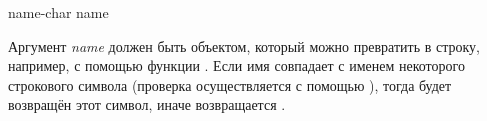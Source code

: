 \begin{defun}[Функция]
name-char name

Аргумент \emph{name} должен быть объектом, который можно превратить в строку,
например, с помощью функции .
Если имя совпадает с именем некоторого строкового символа (проверка
осуществляется с помощью ), тогда будет
возвращён этот символ, иначе возвращается {\false}.
\end{defun}

\fi